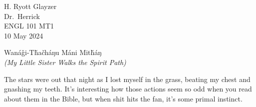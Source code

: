 \documentclass[12pt, letterpaper]{article}
\begin{document}
\begin{flushleft}

H. Ryott Glayzer\\
Dr.\ Herrick\\
ENGL 101 MT1\\
10 May 2024\\


\begin{center}
	\large Wanáǧi-Tȟačháŋu Máni Mitȟáŋ\\ 
	\scriptsize \textit{(My Little Sister Walks the Spirit Path)}
\end{center}


\setlength{\parindent}{0.5in}




The stars were out that night as I lost myself in the grass, beating my chest and gnashing my teeth.
It’s interesting how those actions seem so odd when you read about them in the Bible,
but when shit hits the fan, it’s some primal instinct.
\vspace{5mm}




\end{flushleft}
\end{document}

